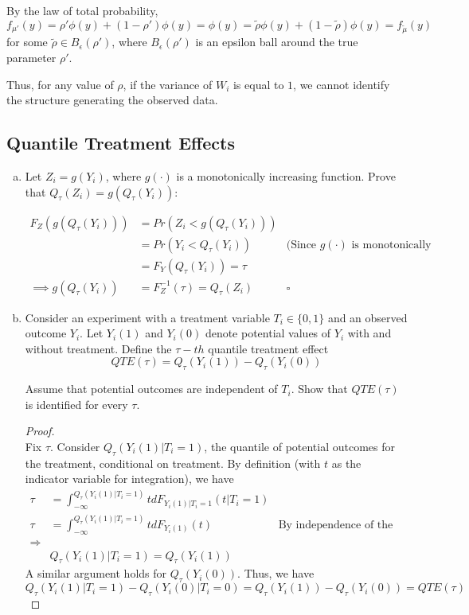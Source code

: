 \documentclass[11pt]{article}
\begin{document}
By the law of total probability, $$f_{\mu'}(y) = \rho' \phi(y) + (1-\rho')\phi(y) = \phi(y) = \tilde \rho \phi(y) + (1-\tilde \rho)\phi(y) = f_{\tilde \mu}(y)$$ for some $\tilde \rho \in B_{\epsilon}(\rho')$, where $B_{\epsilon}(\rho')$ is an epsilon ball around the true parameter $\rho'$. 

Thus, for any value of $\rho$, if the variance of $W_i$ is equal to $1$, we cannot identify the structure generating the observed data.

\subsection*{Quantile Treatment Effects}

\begin{enumerate}[a)]

	\item Let $Z_i = g(Y_i)$, where $g(\cdot)$ is a monotonically increasing function. Prove that $Q_{\tau}(Z_i) = g(Q_{\tau}(Y_i))$:

	\begin{align*}
		F_Z(g(Q_{\tau}(Y_i))) &= Pr(Z_i < g(Q_{\tau}(Y_i))) \\
		&= Pr(Y_i < Q_{\tau}(Y_i)) &\mbox{(Since $g(\cdot)$ is monotonically increasing)} \\
		&= F_Y(Q_{\tau}(Y_i)) = \tau \\
		\implies g(Q_{\tau}(Y_i)) &= F_Z^{-1}(\tau) = Q_{\tau}(Z_i) &\square
	\end{align*}

	\item Consider an experiment with a treatment variable $T_i \in \{0,1\}$ and an observed outcome $Y_i$. Let $Y_i(1)$ and $Y_i(0)$ denote potential values of $Y_i$ with and without treatment. Define the $\tau-th$ quantile treatment effect
	$$QTE(\tau) = Q_\tau(Y_i(1)) - Q_\tau(Y_i(0))$$

	Assume that potential outcomes are independent of $T_i$. Show that $QTE(\tau)$ is identified for every $\tau$.

	\begin{proof}\mbox{}\\
		Fix $\tau$. Consider $Q_\tau(Y_i(1)|T_i = 1)$, the quantile of potential outcomes for the treatment, conditional on treatment. By definition (with $t$ as the indicator variable for integration), we have
		\begin{align*}
			\tau & = \int_{-\infty}^{Q_\tau(Y_i(1)|T_i = 1)}t dF_{Y_i(1)|T_i = 1}(t|T_i = 1) \\
			\tau & = \int_{-\infty}^{Q_\tau(Y_i(1)|T_i = 1)}t dF_{Y_i(1)}(t) &\mbox{By independence of the treatment}\\
			\Longrightarrow & \\
			& Q_\tau(Y_i(1)|T_i = 1) = Q_\tau(Y_i(1))
		\end{align*} 
		A similar argument holds for $Q_\tau(Y_i(0))$. Thus, we have
		$$ Q_\tau(Y_i(1)|T_i = 1) - Q_\tau(Y_i(0)|T_i = 0) = Q_\tau(Y_i(1)) - Q_\tau(Y_i(0)) = QTE(\tau)$$
	\end{proof}


\end{enumerate}
\end{document}
